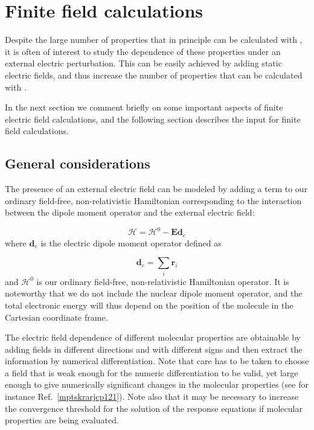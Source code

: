 \chapter{Finite field calculations}\label{ch:finite}

Despite the large number of properties that in principle can be
calculated with \siraba , it is often of interest to study the
dependence of these properties under an external electric
perturbation. This can be easily achieved by adding static electric
fields, and thus increase the number of properties
that can be 
calculated with \siraba .

In the next section we comment briefly on some important aspects of
finite electric field calculations, and the following section
describes the input for finite field calculations.

\section{General considerations}\label{sec:finitegeneral}

The presence of an external electric field can be modeled by adding a
term to our ordinary field-free, non-relativistic Hamiltonian
corresponding to the interaction between the dipole moment operator
and the external electric field:

\begin{equation}
\mathcal{H} = \mathcal{H}^{0} - \mathbf{Ed}_{e}
\end{equation}
where $\mathbf{d}_{e}$ is the electric dipole moment operator defined as 

\begin{equation}
\mathbf{d}_{e} = \sum_{i}\mathbf{r}_{i}
\end{equation}
and $\mathcal{H}^{0}$ is our ordinary field-free, non-relativistic
Hamiltonian operator. It is noteworthy that we do not include the
nuclear dipole moment operator, and the
total electronic energy will 
thus depend on the position of the molecule in the Cartesian
coordinate frame.

The electric field dependence of different molecular properties are
obtainable by adding fields in different directions and with different
signs and then extract the information by numerical
differentiation. Note that care has
to be taken to choose a field that 
is weak enough for the numeric differentiation to be valid,
yet large enough to give numerically significant changes in the
molecular properties (see for instance Ref.~\ref{mptskrarjcp121}). Note
also that it may be necessary to increase  
the convergence threshold for the solution of the response equations
if molecular properties are being evaluated.

